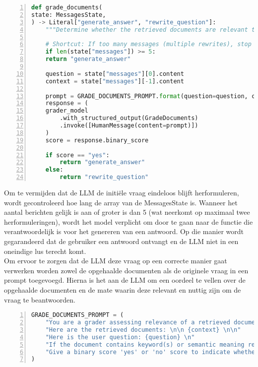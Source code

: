 \begin{lstlisting}[basicstyle=\small, frame=single, breaklines=true, postbreak=\mbox{\textcolor{red}{$\hookrightarrow$}\space}, escapeinside ={\%,}, escapechar={!}, numbers=left, language=Python, caption=Functie die beslist tussen antwoord genereren of vraag herschrijven]
def grade_documents(
state: MessagesState,
) -> Literal["generate_answer", "rewrite_question"]:
    """Determine whether the retrieved documents are relevant to the question."""
    
    # Shortcut: If too many messages (multiple rewrites), stop rewriting
    if len(state["messages"]) >= 5:
    return "generate_answer"
    
    question = state["messages"][0].content
    context = state["messages"][-1].content
    
    prompt = GRADE_DOCUMENTS_PROMPT.format(question=question, context=context)
    response = (
    grader_model
        .with_structured_output(GradeDocuments)
        .invoke([HumanMessage(content=prompt)])
    )
    score = response.binary_score
    
    if score == "yes":
        return "generate_answer"
    else:
        return "rewrite_question"
\end{lstlisting}

Om te vermijden dat de LLM de initiële vraag eindeloos blijft herformuleren, wordt gecontroleerd hoe lang de array van de MessagesState is. Wanneer het aantal berichten gelijk is aan of groter is dan 5 (wat neerkomt op maximaal twee herformuleringen), wordt het model verplicht om door te gaan naar de functie die verantwoordelijk is voor het genereren van een antwoord. Op die manier wordt gegarandeerd dat de gebruiker een antwoord ontvangt en de LLM niet in een oneindige lus terecht komt.
\\[1em]
Om ervoor te zorgen dat de LLM deze vraag op een correcte manier gaat verwerken worden zowel de opgehaalde documenten als de originele vraag in een prompt toegevoegd. Hierna is het aan de LLM om een oordeel te vellen over de opgehaalde documenten en de mate waarin deze relevant en nuttig zijn om de vraag te beantwoorden.
\begin{lstlisting}[basicstyle=\small, frame=single, breaklines=true, postbreak=\mbox{\textcolor{red}{$\hookrightarrow$}\space}, escapeinside ={\%,}, escapechar={!}, numbers=left, language=Python, caption=Prompt om opgehaalde documenten te beoordelen op basis van de gestelde vraag]
GRADE_DOCUMENTS_PROMPT = (
    "You are a grader assessing relevance of a retrieved document to a user question. \n "
    "Here are the retrieved documents: \n\n {context} \n\n"
    "Here is the user question: {question} \n"
    "If the document contains keyword(s) or semantic meaning related to the user question, grade it as relevant. \n"
    "Give a binary score 'yes' or 'no' score to indicate whether the document is relevant to the question."
)
\end{lstlisting}

